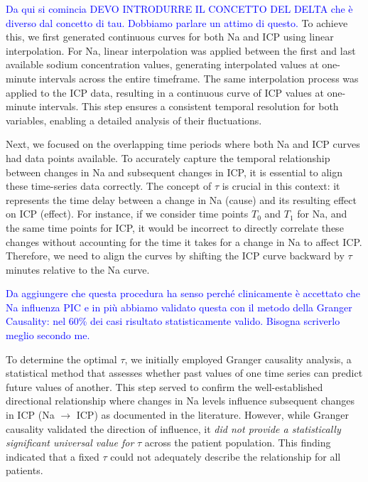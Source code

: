 \textcolor{blue}{Da qui si comincia}
\textcolor{blue}{DEVO INTRODURRE IL CONCETTO DEL DELTA che è diverso dal concetto di tau. Dobbiamo parlare un attimo di questo. }
To achieve this, we first generated continuous curves for both Na and ICP using linear interpolation. For Na, linear interpolation was applied between the first and last available sodium concentration values, generating interpolated values at one-minute intervals across the entire timeframe. The same interpolation process was applied to the ICP data, resulting in a continuous curve of ICP values at one-minute intervals. This step ensures a consistent temporal resolution for both variables, enabling a detailed analysis of their fluctuations.

Next, we focused on the overlapping time periods where both Na and ICP curves had data points available. To accurately capture the temporal relationship between changes in Na and subsequent changes in ICP, it is essential to align these time-series data correctly. The concept of $\tau$ is crucial in this context: it represents the time delay between a change in Na (cause) and its resulting effect on ICP (effect). For instance, if we consider time points $T_0$ and $T_1$ for Na, and the same time points for ICP, it would be incorrect to directly correlate these changes without accounting for the time it takes for a change in Na to affect ICP. Therefore, we need to align the curves by shifting the ICP curve backward by $\tau$ minutes relative to the Na curve.

\textcolor{blue}{Da aggiungere che questa procedura ha senso perché clinicamente è accettato che Na influenza PIC e in più abbiamo validato questa con il metodo della Granger Causality: nel 60\% dei casi risultato statisticamente valido. Bisogna scriverlo meglio secondo me.}

To determine the optimal $\tau$, we initially employed Granger causality analysis, a statistical method that assesses whether past values of one time series can predict future values of another. This step served to confirm the well-established directional relationship where changes in Na levels influence subsequent changes in ICP (Na $\rightarrow$ ICP) as documented in the literature. However, while Granger causality validated the direction of influence, it \textit{did not provide a statistically significant universal value for} $\tau$ across the patient population. This finding indicated that a fixed $\tau$ could not adequately describe the relationship for all patients.

